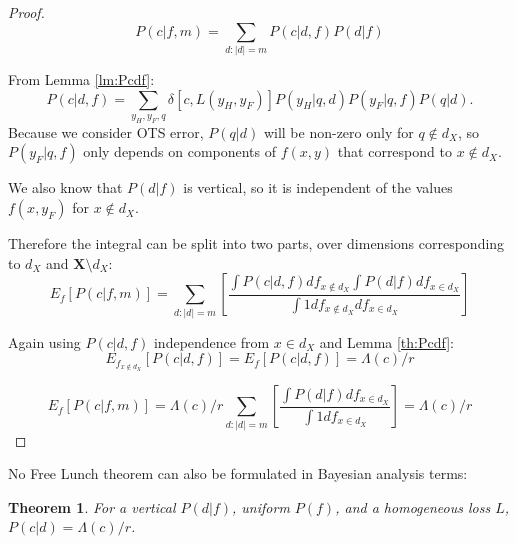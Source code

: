 \documentclass[a4paper]{article}
\newtheorem{theorem}{Theorem}[section]
\begin{document}
\begin{proof}
  \begin{equation}
    P\left(c|f,m\right) = \sum_{d:|d|=m} P\left(c|d,f\right)P\left(d|f\right)
  \end{equation}

  From Lemma \ref{lm:Pcdf}:
  \begin{equation}
    P(c|d,f) = \sum_{y_H,y_F,q}\delta\left[c,L\left(y_H, y_F\right)\right] P\left(y_H|q, d\right)
    P\left(y_F| q, f\right)P\left(q|d\right).
  \end{equation}
  Because we consider OTS error, $P\left(q|d\right)$ will be non-zero
  only for $q \notin d_X$, so $P\left(y_F| q, f\right)$ only depends on
  components of $f(x,y)$ that correspond to $x\notin d_X$.
  
  We also know that $P\left(d|f\right)$ is vertical, so it is
  independent of the values $f(x,y_F)$ for $x \notin d_X$.
  
  Therefore the integral can be split into two parts, over dimensions
  corresponding to $d_X$ and $\mathbf{X} \setminus d_X$:
  \begin{equation}
    E_f \left[P\left(c|f,m\right)\right] = \sum_{d:|d|=m}\left[\frac{
      \int P\left(c|d,f \right) df_{x\notin d_X}
        \int P\left(d|f\right) df_{x \in d_X}}{\int 1 df_{x\notin d_X} df_{x \in d_X}}\right]
  \end{equation}
  
  Again using $P\left(c|d, f\right)$ independence from $x\in d_X$ and Lemma \ref{th:Pcdf}:
  \begin{equation}
    E_{f_{x\notin d_X}} \left[P\left(c|d, f\right)\right] = E_f \left[P\left(c|d, f\right)\right] = 
    \Lambda(c)/r
  \end{equation}
  
  \begin{equation}
    E_f \left[P\left(c|f,m\right)\right] = \Lambda(c)/r \sum_{d:|d|=m}\left[\frac{
      \int  P\left(d|f\right) df_{x \in d_X}}{\int 1 df_{x \in d_X}} \right] =
    \Lambda(c)/r
  \end{equation}
\end{proof}

No Free Lunch theorem can also be formulated in Bayesian analysis
terms:
\begin{theorem}
  For a vertical $P(d|f)$, uniform $P(f)$, and a homogeneous loss $L$,
  $P(c|d) = \Lambda(c)/r$.
  \label{Pcd}
\end{theorem}
\end{document}
